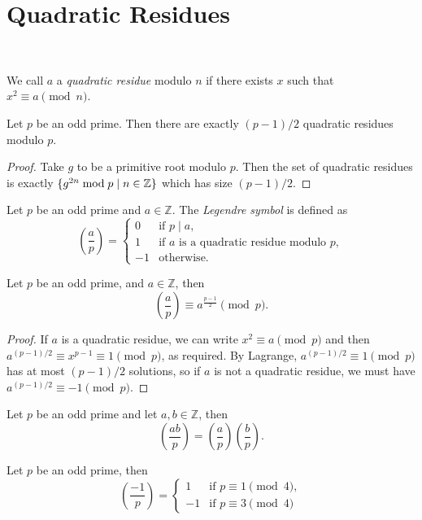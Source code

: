 \documentclass[a4paper, 10pt, twocolumn]{amsart}
\begin{document}
\section{Quadratic Residues}
\ 
\begin{definition}
We call $a$ a \emph{quadratic residue} modulo $n$ if there exists $x$ such that $x^2 \equiv a \pmod{n}$.
\end{definition}

\begin{lemma}
  Let $p$ be an odd prime. Then there are exactly $(p-1)/2$ quadratic residues modulo $p$.
\end{lemma}
\begin{proof}
  Take $g$ to be a primitive root modulo $p$. Then the set of quadratic residues is exactly $\{g^{2n} \bmod p \mid n \in \mathbb{Z}\}$ which has size $(p-1)/2$.
\end{proof}

\begin{definition}
Let $p$ be an odd prime and $a \in \mathbb{Z}$. The \emph{Legendre symbol} is defined as
  $$
  \left(\frac{a}{p}\right)=\begin{cases}
    0 & \text{if } p \mid a, \\
  1 & \text{if } a \text { is a quadratic residue modulo } p, \\
  -1 & \text{otherwise}.
   \end{cases}
  $$
\end{definition}

\begin{theorem}
  Let $p$ be an odd prime, and $a \in \mathbb{Z}$, then
  $$
  \left(\frac{a}{p}\right) \equiv a^{\frac{p-1}{2}} \pmod{p}.
  $$
\end{theorem}
\begin{proof}
    If $a$ is a quadratic residue, we can write $x^2 \equiv a \pmod{p}$ and then $a^{(p-1)/2}\equiv x^{p-1} \equiv 1\pmod{p}$, as required. 
    By Lagrange, $a^{(p-1)/2} \equiv 1 \pmod{p}$ has at most $(p-1)/2$ solutions, so if $a$ is not a quadratic residue, we must have $a^{(p-1)/2} \equiv -1 \pmod{p}$. 
\end{proof}

\begin{corollary}
  Let $p$ be an odd prime and let $a, b \in \mathbb{Z}$, then
$$
\left(\frac{a b}{p}\right)=\left(\frac{a}{p}\right)\left(\frac{b}{p}\right).
$$
\end{corollary}
\begin{corollary}
  Let $p$ be an odd prime, then
  $$
  \left(\frac{-1}{p}\right)=\begin{cases}
    1 & \text{if } p \equiv 1 \pmod{4}, \\
  -1 & \text{if } p \equiv 3 \pmod{4}
   \end{cases}
  $$
\end{corollary}
\end{document}
